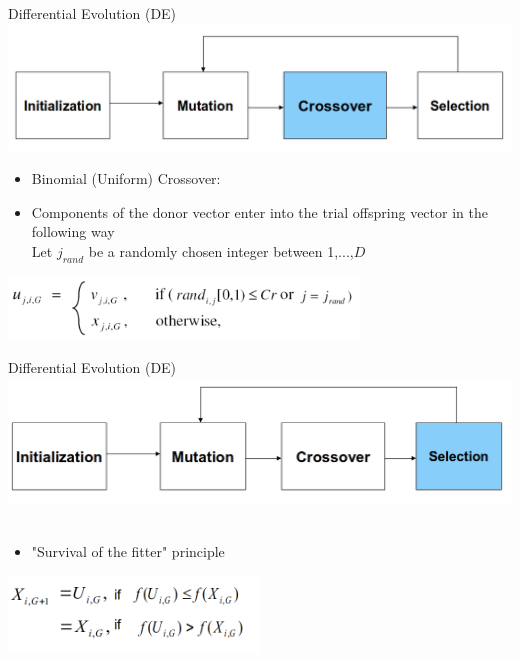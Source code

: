 \begin{frame}{Differential Evolution (DE)}
\centering
\includegraphics[width=1.0\textwidth]{new_images/DE8.png}\\
\begin{itemize}
    \item Binomial (Uniform) Crossover:
    \item Components of the donor vector enter into the trial offspring vector in the following way\\
    Let $j_{rand}$ be a randomly chosen integer between 1,...,$D$
\end{itemize}
\includegraphics[width=0.7\textwidth]{new_images/DE9.png}\\
\end{frame}

\begin{frame}{Differential Evolution (DE)}
\includegraphics[width=1.0\textwidth]{new_images/DE10.png}\\~\\
\begin{itemize}
    \item "Survival of the fitter" principle \\
\end{itemize}
\centering
\includegraphics[width=0.5\textwidth]{new_images/EAs_selec.png}
\end{frame}


